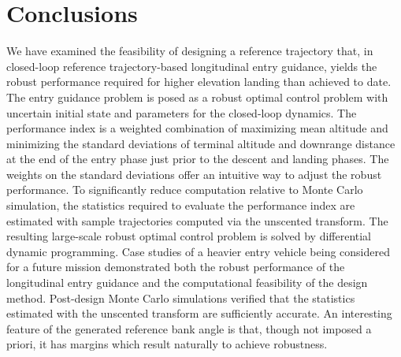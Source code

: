 \documentclass[journal ]{new-aiaa}
\begin{document}
\section*{Conclusions}
We have examined the feasibility of designing a reference trajectory that, in closed-loop reference trajectory-based longitudinal entry guidance, yields the robust performance required for higher elevation landing than achieved to date. The entry guidance problem is posed as a robust optimal control problem with uncertain initial state and parameters for the closed-loop dynamics. The performance index is a weighted combination of maximizing mean altitude and minimizing the standard deviations of terminal altitude and downrange distance at the end of the entry phase just prior to the descent and landing phases. The weights on the standard deviations offer an intuitive way to adjust the robust performance. To significantly reduce computation relative to Monte Carlo simulation, the statistics required to evaluate the performance index are estimated with sample trajectories computed via the unscented transform. The resulting large-scale robust optimal control problem is solved by differential dynamic programming. Case studies of a heavier entry vehicle being considered for a future mission demonstrated both the robust performance of the longitudinal entry guidance and the computational feasibility of the design method. Post-design Monte Carlo simulations verified that the statistics estimated with the unscented transform are sufficiently accurate. An interesting feature of the generated reference bank angle is that, though not imposed a priori, it has margins which result naturally to achieve robustness.

\end{document}
